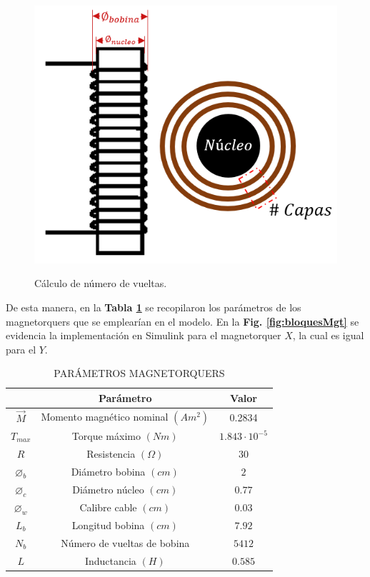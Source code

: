 \begin{figure}[!ht]
	\begin{center}
		\includegraphics[scale=0.7]{imagenes/modelo_dinamico/dimensiones_mgt.png}\\
	\end{center}
	\caption{Cálculo de número de vueltas.}
	\label{fig:numVueltas}
\end{figure}

De esta manera, en la \textbf{Tabla \ref{table:Mgt}} se recopilaron los parámetros de los magnetorquers que se emplearían en el modelo. En la \textbf{Fig. \ref{fig:bloquesMgt}} se evidencia la implementación en Simulink para el magnetorquer $X$, la cual es igual para el $Y$. 
\newpage
\begin{table}[!ht]
	\caption{\MakeUppercase{Parámetros Magnetorquers }}
	\begin{center}
		\begin{tabular}{ c c c}
			
			&  \textbf{Parámetro} &  \textbf{Valor}\\ \hline
			$\vec{M}$ &  Momento magnético nominal $(Am^2)$ & 0.2834\\ 
			$T_{max}$ &  Torque máximo $(Nm)$ & $1.843\cdot10^{-5}$ \\ 
			$R$ &  Resistencia $(\Omega)$& $30$ \\ 
			$\diameter_{b}$ &  Diámetro bobina $(cm)$& $2$ \\
			$\diameter_{c}$ &  Diámetro núcleo $(cm)$& $0.77$ \\
			$\diameter_{w}$ &  Calibre cable $(cm)$& $0.03$ \\  
			$L_{b}$ & Longitud bobina $(cm)$ & $7.92$ \\
			$N_{b}$ & Número de vueltas de bobina  & $5412$ \\
			$L$ & Inductancia $(H)$ & $0.585$ \\ \hline
			
		\end{tabular}
	\end{center}
	\label{table:Mgt}
\end{table}



